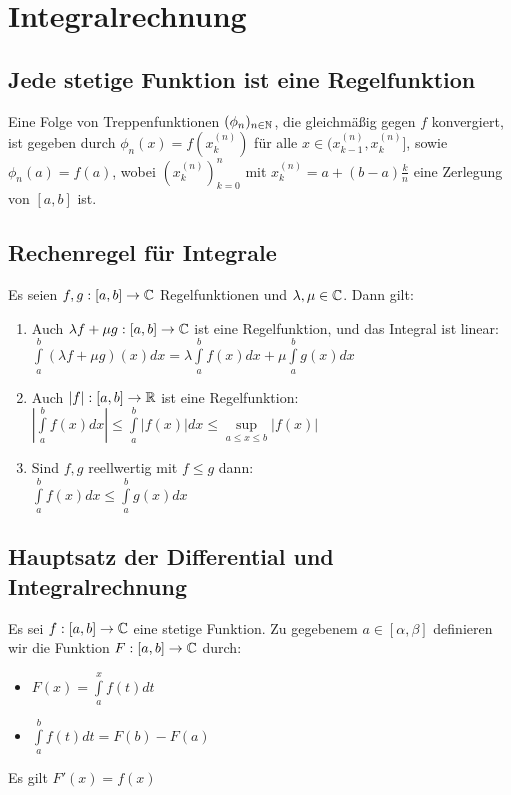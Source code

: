 \documentclass[german]{latex4ei/latex4ei_sheet}
\begin{document}
\section{Integralrechnung}

\begin{sectionbox}
	\subsection{Jede stetige Funktion ist eine Regelfunktion }
	Eine Folge von Treppenfunktionen $(\phi_n)_{n \in \operatorname{\mathbb N}}$, die gleichmäßig gegen $f$ konvergiert, ist gegeben durch
	$\phi_n(x) = f(x_k^{(n)})$  für alle $x \in (x_{k-1}^{(n)} ,x_k^{(n)}]$, sowie $\phi_n(a) = f(a)$, wobei $(x_k^{(n)})_{k=0}^{n}$  mit $x_k^{(n)}=a+(b-a) \frac{k}{n}$ eine Zerlegung von $[a,b]$ ist.
\end{sectionbox}

\begin{sectionbox}
	\subsection{Rechenregel für Integrale}
	Es seien $f, g : [a, b] \rightarrow \mathbb C$ Regelfunktionen und $\lambda, \mu \in \mathbb C$. Dann gilt:
	\begin{enumerate}
		\item Auch $\lambda f + \mu g : [a, b] \rightarrow \mathbb C$ ist eine Regelfunktion, und das Integral ist linear:\\ $\int \limits_a^b (\lambda f +\mu g)(x)dx= \lambda \int \limits_a^b f(x) dx + \mu \int \limits_a^b g(x)dx$
		\item Auch $|f| : [a, b] \rightarrow \operatorname{\mathbb R}$ ist eine Regelfunktion:\\
		  	$|\int \limits_a^b f(x)dx | \le \int \limits_a^b |f(x)|dx \le \sup\limits_{a \le x \le b}|f(x)|$
		\item Sind $f, g$ reellwertig mit $f \le g$ dann:\\ $\int \limits_a^b f(x)dx \le \int \limits_a^b g(x)dx$
	\end{enumerate}
\end{sectionbox}
\begin{sectionbox}
	\subsection{Hauptsatz der Differential und Integralrechnung}

	Es sei $f : [a,b] \rightarrow \mathbb C$ eine stetige Funktion. Zu gegebenem $a \in [\alpha, \beta]$ definieren wir die Funktion $F : [a, b] \rightarrow \mathbb C$ durch:
	\begin{itemize}
		\item $F(x)= \int \limits_a^x f(t)dt $
		\item $\int \limits_a^b f(t)dt = F(b)-F(a)$
	\end{itemize}
	Es gilt $F'(x)=f(x)$


\end{sectionbox}
\end{document}
